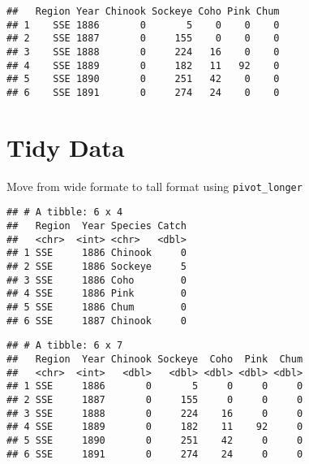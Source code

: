 \documentclass[]{article}
\newenvironment{Shaded}{\begin{snugshade}}{\end{snugshade}}
\newcommand{\DataTypeTok}[1]{\textcolor[rgb]{0.13,0.29,0.53}{#1}}
\newcommand{\KeywordTok}[1]{\textcolor[rgb]{0.13,0.29,0.53}{\textbf{#1}}}
\newcommand{\NormalTok}[1]{#1}
\newcommand{\OperatorTok}[1]{\textcolor[rgb]{0.81,0.36,0.00}{\textbf{#1}}}
\newcommand{\StringTok}[1]{\textcolor[rgb]{0.31,0.60,0.02}{#1}}
\begin{document}
\begin{verbatim}
##   Region Year Chinook Sockeye Coho Pink Chum
## 1    SSE 1886       0       5    0    0    0
## 2    SSE 1887       0     155    0    0    0
## 3    SSE 1888       0     224   16    0    0
## 4    SSE 1889       0     182   11   92    0
## 5    SSE 1890       0     251   42    0    0
## 6    SSE 1891       0     274   24    0    0
\end{verbatim}

\hypertarget{tidy-data}{%
\section{Tidy Data}\label{tidy-data}}

Move from wide formate to tall format using \texttt{pivot\_longer}

\begin{Shaded}
\end{Shaded}

\begin{verbatim}
## # A tibble: 6 x 4
##   Region  Year Species Catch
##   <chr>  <int> <chr>   <dbl>
## 1 SSE     1886 Chinook     0
## 2 SSE     1886 Sockeye     5
## 3 SSE     1886 Coho        0
## 4 SSE     1886 Pink        0
## 5 SSE     1886 Chum        0
## 6 SSE     1887 Chinook     0
\end{verbatim}

\begin{Shaded}
\end{Shaded}

\begin{verbatim}
## # A tibble: 6 x 7
##   Region  Year Chinook Sockeye  Coho  Pink  Chum
##   <chr>  <int>   <dbl>   <dbl> <dbl> <dbl> <dbl>
## 1 SSE     1886       0       5     0     0     0
## 2 SSE     1887       0     155     0     0     0
## 3 SSE     1888       0     224    16     0     0
## 4 SSE     1889       0     182    11    92     0
## 5 SSE     1890       0     251    42     0     0
## 6 SSE     1891       0     274    24     0     0
\end{verbatim}
\end{document}
